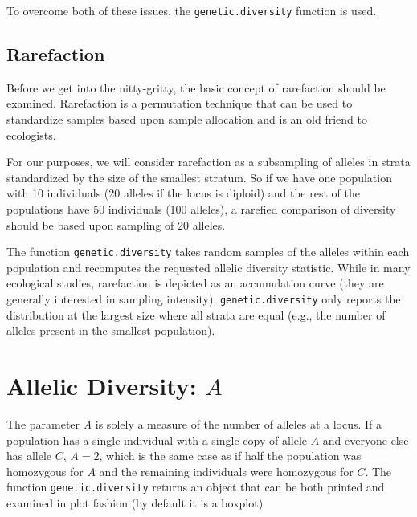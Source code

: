 \documentclass[letterpaper,twoside,openany]{book}
\begin{document}
To overcome both of these issues, the \texttt{genetic.diversity} function is used.

\subsection{Rarefaction}

Before we get into the nitty-gritty, the basic concept of rarefaction should be examined.  Rarefaction is a permutation technique that can be used to standardize samples based upon sample allocation and is an old friend to ecologists.  

For our purposes, we will consider rarefaction as a subsampling of alleles in strata standardized by the size of the smallest stratum.  So if we have one population with 10 individuals (20 alleles if the locus is diploid) and the rest of the populations have 50 individuals (100 alleles), a rarefied comparison of diversity should be based upon sampling of 20 alleles.

The function \texttt{genetic.diversity} takes random samples of the alleles within each population and recomputes the requested allelic diversity statistic.  While in many ecological studies, rarefaction is depicted as an accumulation curve (they are generally interested in sampling intensity), \texttt{genetic.diversity} only reports the distribution at the largest size where all strata are equal (e.g., the number of alleles present in the smallest population). 

\section{Allelic Diversity: $A$}

The parameter \emph{A} is solely a measure of the number of alleles at a locus.  If a population has a single individual with a single copy of allele $A$ and everyone else has allele $C$, $A=2$, which is the same case as if half the population was homozygous for $A$ and the remaining individuals were homozygous for $C$.  The function \texttt{genetic.diversity} returns an object that can be both printed and examined in plot fashion (by default it is a boxplot)
\end{document}
